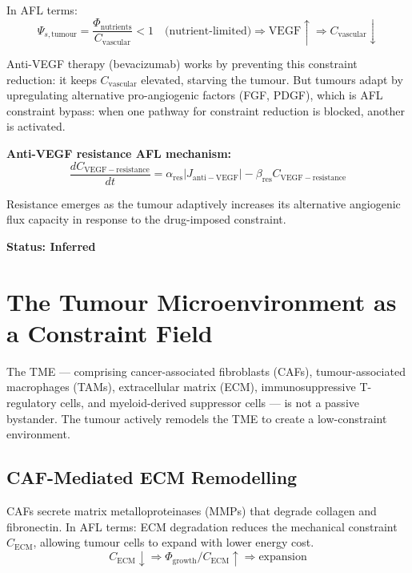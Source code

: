 \documentclass[12pt,a4paper]{article}
\begin{document}
In AFL terms:
\begin{equation}
    \Psi_{s,\mathrm{tumour}} = \frac{\Phi_{\mathrm{nutrients}}}{C_{\mathrm{vascular}}} < 1 \quad \text{(nutrient-limited)} \Rightarrow \text{VEGF} \uparrow \Rightarrow C_{\mathrm{vascular}} \downarrow
\end{equation}

Anti-VEGF therapy (bevacizumab) works by preventing this constraint reduction: it keeps $C_{\mathrm{vascular}}$ elevated, starving the tumour. But tumours adapt by upregulating alternative pro-angiogenic factors (FGF, PDGF), which is AFL constraint bypass: when one pathway for constraint reduction is blocked, another is activated.

\textbf{Anti-VEGF resistance AFL mechanism:}
\begin{equation}
    \frac{dC_{\mathrm{VEGF-resistance}}}{dt} = \alpha_{\mathrm{res}} |J_{\mathrm{anti-VEGF}}| - \beta_{\mathrm{res}} C_{\mathrm{VEGF-resistance}}
\end{equation}

Resistance emerges as the tumour adaptively increases its alternative angiogenic flux capacity in response to the drug-imposed constraint.

\textbf{Status: Inferred}

\section{The Tumour Microenvironment as a Constraint Field}

The TME --- comprising cancer-associated fibroblasts (CAFs), tumour-associated macrophages (TAMs), extracellular matrix (ECM), immunosuppressive T-regulatory cells, and myeloid-derived suppressor cells --- is not a passive bystander. The tumour actively remodels the TME to create a low-constraint environment.

\subsection{CAF-Mediated ECM Remodelling}

CAFs secrete matrix metalloproteinases (MMPs) that degrade collagen and fibronectin. In AFL terms: ECM degradation reduces the mechanical constraint $C_{\mathrm{ECM}}$, allowing tumour cells to expand with lower energy cost.
\begin{equation}
    C_{\mathrm{ECM}} \downarrow \Rightarrow \Phi_{\mathrm{growth}} / C_{\mathrm{ECM}} \uparrow \Rightarrow \text{expansion}
\end{equation}
\end{document}
